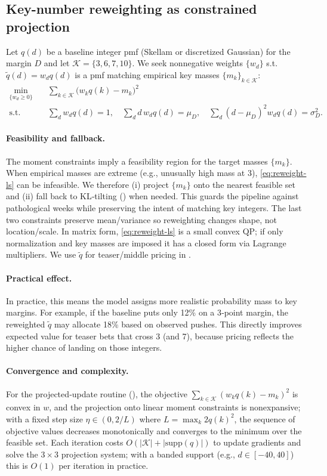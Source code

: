 \subsection{Key-number reweighting as constrained projection}\label{subsec:key-reweight}
Let $q(d)$ be a baseline integer pmf (Skellam or discretized Gaussian) for the margin $D$ and let
$\mathcal{K}=\{3,6,7,10\}$. We seek nonnegative weights $\{w_d\}$ s.t. $\tilde q(d)=w_d q(d)$ is a
pmf matching empirical key masses $\{m_k\}_{k\in\mathcal{K}}$:
\begin{align}\label{eq:reweight-ls}
\min_{\{w_d\ge0\}} \quad & \sum_{k\in\mathcal{K}} \big(w_k q(k)-m_k\big)^2 \\
\text{s.t.}\quad &
\sum_{d} w_d q(d)=1,\quad
\sum_d d\,w_d q(d)=\mu_D,\quad
\sum_d (d-\mu_D)^2 w_d q(d)=\sigma_D^2. \nonumber
\end{align}
\paragraph{Feasibility and fallback.} The moment constraints imply a feasibility region for the target masses $\{m_k\}$. When empirical masses are extreme (e.g., unusually high mass at 3), \eqref{eq:reweight-ls} can be infeasible. We therefore (i) project $\{m_k\}$ onto the nearest feasible set and (ii) fall back to KL‑tilting () when needed. This guards the pipeline against pathological weeks while preserving the intent of matching key integers.
The last two constraints preserve mean/variance so reweighting changes shape, not location/scale.
In matrix form, \eqref{eq:reweight-ls} is a small convex QP; if only normalization and key masses
are imposed it has a closed form via Lagrange multipliers. We use $\tilde q$ for teaser/middle pricing in .

\paragraph{Practical effect.} In practice, this means the model assigns more realistic probability mass to key margins. For example, if the baseline puts only 12\% on a 3‑point margin, the reweighted $\tilde q$ may allocate 18\% based on observed pushes. This directly improves expected value for teaser bets that cross 3 (and 7), because pricing reflects the higher chance of landing on those integers.

\paragraph{Convergence and complexity.} For the projected‑update routine (), the objective $\sum_{k\in\mathcal K}(w_k q(k)-m_k)^2$ is convex in $w$, and the projection onto linear moment constraints is nonexpansive; with a fixed step size $\eta\in(0,2/L)$ where $L=\max_k 2 q(k)^2$, the sequence of objective values decreases monotonically and converges to the minimum over the feasible set. Each iteration costs $O(|\mathcal K|+|\mathrm{supp}(q)|)$ to update gradients and solve the $3\times3$ projection system; with a banded support (e.g., $d\in[-40,40]$) this is $O(1)$ per iteration in practice.

